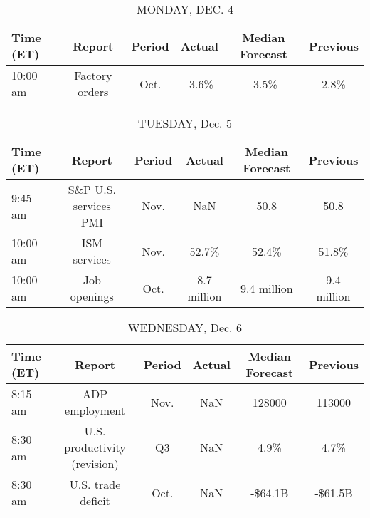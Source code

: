 \documentclass{article}%
\begin{document}
%
\normalsize%


\begin{table}[htbp]%
\caption{MONDAY, DEC. 4}%
\centering%
\begin{adjustbox}{width=1\textwidth}%
\begin{tabular}{lccccc}
\toprule
Time (ET) &         Report & Period & Actual & Median Forecast & Previous \\
\midrule
 10:00 am & Factory orders &   Oct. &  -3.6\% &           -3.5\% &     2.8\% \\
\bottomrule
\end{tabular}
%
\end{adjustbox}%
\end{table}

%


\begin{table}[htbp]%
\caption{TUESDAY, Dec. 5}%
\centering%
\begin{adjustbox}{width=1\textwidth}%
\begin{tabular}{lccccc}
\toprule
Time (ET) &                Report & Period &      Actual & Median Forecast &    Previous \\
\midrule
  9:45 am & S\&P U.S. services PMI &   Nov. &         NaN &            50.8 &        50.8 \\
 10:00 am &          ISM services &   Nov. &       52.7\% &           52.4\% &       51.8\% \\
 10:00 am &          Job openings &   Oct. & 8.7 million &     9.4 million & 9.4 million \\
\bottomrule
\end{tabular}
%
\end{adjustbox}%
\end{table}

%


\begin{table}[htbp]%
\caption{WEDNESDAY, Dec. 6}%
\centering%
\begin{adjustbox}{width=1\textwidth}%
\begin{tabular}{lccccc}
\toprule
Time (ET) &                       Report & Period & Actual & Median Forecast & Previous \\
\midrule
  8:15 am &               ADP employment &   Nov. &    NaN &          128000 &   113000 \\
  8:30 am & U.S. productivity (revision) &     Q3 &    NaN &            4.9\% &     4.7\% \\
  8:30 am &           U.S. trade deficit &   Oct. &    NaN &         -\$64.1B &  -\$61.5B \\
\bottomrule
\end{tabular}
%
\end{adjustbox}%
\end{table}
\end{document}
